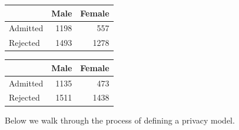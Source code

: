 \begin{table}[!h]

\centering
\begin{tabular}[t]{lrr}
\toprule
  & Male & Female\\
\midrule
Admitted & 1198 & 557\\
Rejected & 1493 & 1278\\
\bottomrule
\end{tabular}
\centering
\begin{tabular}[t]{lrr}
\toprule
  & Male & Female\\
\midrule
Admitted & 1135 & 473\\
Rejected & 1511 & 1438\\
\bottomrule
\end{tabular}
\end{table}

Below we walk through the process of defining a privacy model.

